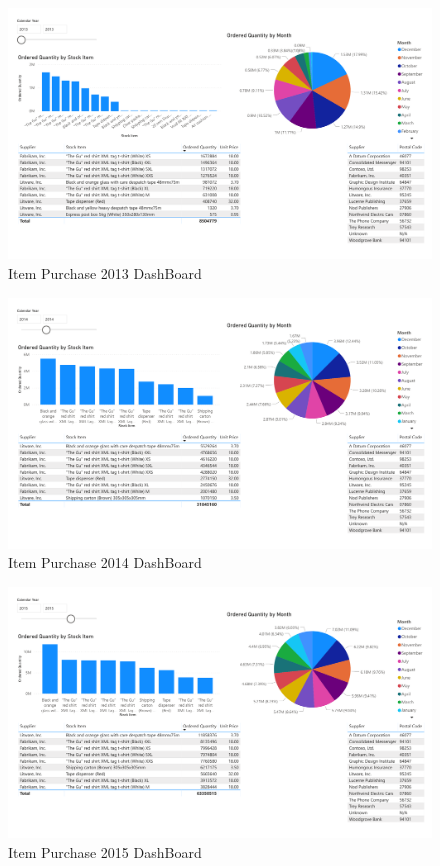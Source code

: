 \documentclass[12pt]{article}
\begin{document}
\begin{figure}[H]
    \centering
    \includegraphics[width=18.5cm, angle=90]
    {images/item Purchase2013.pdf}
    \caption{Item Purchase 2013 DashBoard}
    \label{Item Purchase 2013 DashBoard}
\end{figure}
\begin{figure}[H]
    \centering
    \includegraphics[width=18.5cm, angle=90]
    {images/item Purchase2014.pdf}
    \caption{Item Purchase 2014 DashBoard}
    \label{Item Purchase 2014 DashBoard}
\end{figure}
\begin{figure}[H]
    \centering
    \includegraphics[width=18.5cm, angle=90]
    {images/item Purchase2015.pdf}
    \caption{Item Purchase 2015 DashBoard}
    \label{Item Purchase 2015 DashBoard}
\end{figure}
\end{document}
